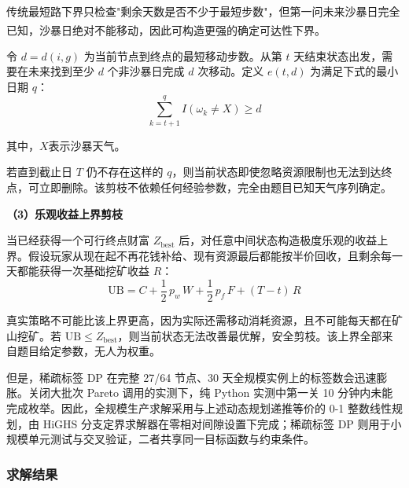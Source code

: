 \documentclass{cumcmthesis}
\numberwithin{equation}{section}
\numberwithin{figure}{section}
\numberwithin{table}{section}
\begin{document}
传统最短路下界只检查"剩余天数是否不少于最短步数"，但第一问未来沙暴日完全已知，沙暴日绝对不能移动，因此可构造更强的确定可达性下界\textsuperscript{\cite{hujianpeng2022}}。

令 $d = d(i,g)$ 为当前节点到终点的最短移动步数。从第 $t$ 天结束状态出发，需要在未来找到至少 $d$ 个非沙暴日完成 $d$ 次移动。定义 $e(t,d)$ 为满足下式的最小日期 $q$：
 \vspace{-10pt} 
\begin{equation}
\sum_{k=t+1}^{q} I(\omega_k \neq X) \geq d
\label{eq:sand_arrival}
\end{equation}

其中，$X$表示沙暴天气。

若直到截止日 $T$ 仍不存在这样的 $q$，则当前状态即使忽略资源限制也无法到达终点，可立即删除。该剪枝不依赖任何经验参数，完全由题目已知天气序列确定。

\textbf{（3）乐观收益上界剪枝}

当已经获得一个可行终点财富 $Z_{\text{best}}$ 后，对任意中间状态构造极度乐观的收益上界。假设玩家从现在起不再花钱补给、现有资源最后都能按半价回收，且剩余每一天都能获得一次基础挖矿收益 $R$：
\vspace{-10pt}
\begin{equation}
\text{UB} = C + \frac{1}{2}\,p_w\,W + \frac{1}{2}\,p_f\,F + (T - t)\,R
\label{eq:ub}
\end{equation}

真实策略不可能比该上界更高，因为实际还需移动消耗资源，且不可能每天都在矿山挖矿。若 $\text{UB} \leq Z_{\text{best}}$，则当前状态无法改善最优解，安全剪枝。该上界全部来自题目给定参数，无人为权重。

但是，稀疏标签 DP 在完整 27/64 节点、30 天全规模实例上的标签数会迅速膨胀。关闭大批次 Pareto 调用的实测下，纯 Python 实测中第一关 10 分钟内未能完成枚举。因此，全规模生产求解采用与上述动态规划递推等价的 0-1 整数线性规划，由 HiGHS 分支定界求解器在零相对间隙设置下完成；稀疏标签 DP 则用于小规模单元测试与交叉验证，二者共享同一目标函数与约束条件。


\subsubsection{求解结果}
\end{document}
